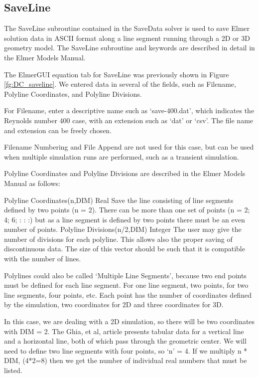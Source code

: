 \subsection*{SaveLine}

The SaveLine subroutine contained in the SaveData solver is used to save Elmer solution data in ASCII format
along a line segment running through a 2D or 3D geometry model.  The SaveLine subroutine and keywords are described in
detail in the Elmer Models Manual.

The ElmerGUI equation tab for SaveLine was previously shown in Figure \ref{fg:DC_saveline}.  We entered data in
several of the fields, such as Filename, Polyline Coordinates, and Polyline Divisions.

For Filename, enter a descriptive name such as `save-400.dat', which indicates the Reynolds number 400 case,
with an extension such as `dat' or `csv'.  The file name and extension can be freely chosen.

Filename Numbering and File Append are not used for this case, but can be used when multiple simulation runs
are performed, such as a transient simulation.

Polyline Coordinates and Polyline Divisions are described in the Elmer Models Manual as follows:

\ttbegin
Polyline Coordinates(n,DIM) Real
  Save the line consisting of line segments defined by two points (n = 2).
  There can be more than one set of points (n = 2; 4; 6; : : :) but as a
  line segment is defined by two points there must be an even number of points.
Polyline Divisions(n/2,DIM) Integer
  The user may give the number of divisions for each polyline. This allows
  also the proper saving of discontinuous data. The size of this vector should
  be such that it is compatible with the number of lines.
\ttend

Polylines could also be called `Multiple Line Segments', because two end points must be defined for
each line segment.  For one line segment, two points, for two line segments, four points, etc.
Each point has the number of coordinates defined by the simulation, two coordinates for 2D and
three coordinates for 3D.  

In this case, we are dealing with a 2D simulation, so there will be two coordinates with DIM = 2.
The Ghia, et al, article presents tabular data for a vertical line and a horizontal line, both of which
pass through the geometric center.  We will need to define two line segments with four points,
so `n' = 4.  If we multiply n * DIM, (4*2=8) then we get the number of individual real numbers
that must be listed.  

